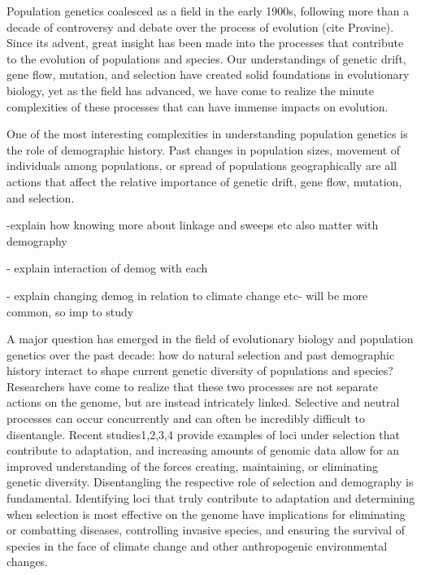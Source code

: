 


Population genetics coalesced as a field in the early 1900s, following more than a decade of 
controversy and debate over the process of evolution (cite Provine). Since its advent, 
great insight has been made into the processes that contribute to the evolution of populations 
and species. Our understandings of genetic drift, gene flow, mutation, and selection have 
created solid foundations in evolutionary biology, yet as the field has advanced, we have come 
to realize the minute complexities of these processes that can have immense impacts on evolution.

One of the most interesting complexities in understanding population genetics is the role of 
demographic history. Past changes in population sizes, movement of individuals among populations, 
or spread of populations geographically are all actions that affect the relative importance of 
genetic drift, gene flow, mutation, and selection.

-explain how knowing more about linkage and sweeps etc also matter with demography

- explain interaction of demog with each

- explain changing demog in relation to climate change etc- will be more common, so imp to study


A major question has emerged in the field of evolutionary biology and population genetics 
over the past decade: how do natural selection and past demographic history interact to shape 
current genetic diversity of populations and species? Researchers have come to realize that 
these two processes are not separate actions on the genome, but are instead intricately linked. 
Selective and neutral processes can occur concurrently and can often be incredibly difficult to 
disentangle. Recent studies1,2,3,4 provide examples of loci under selection that contribute to 
adaptation, and increasing amounts of genomic data allow for an improved understanding of the 
forces creating, maintaining, or eliminating genetic diversity. Disentangling the respective 
role of selection and demography is fundamental. Identifying loci that truly contribute to 
adaptation and determining when selection is most effective on the genome have implications 
for eliminating or combatting diseases, controlling invasive species, and ensuring the survival 
of species in the face of climate change and other anthropogenic environmental changes.

